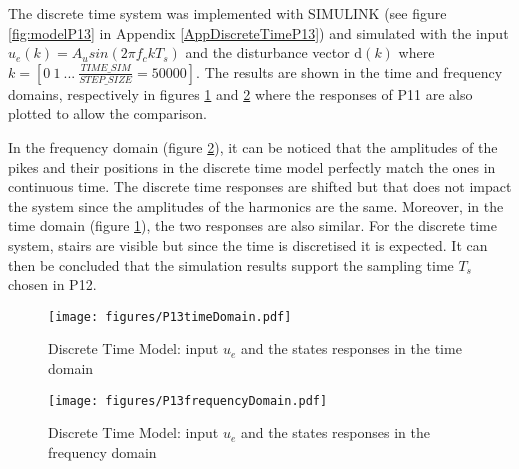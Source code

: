 The discrete time system was implemented with SIMULINK (see figure \ref{fig:modelP13} in Appendix \ref{AppDiscreteTimeP13}) and simulated with the input $u_e(k) = A_u sin(2\pi f_c k T_s)$ and the disturbance vector $\text{d}(k)$ where $k = [0 \ 1 \ ... \ \frac{TIME\_SIM}{STEP\_SIZE} = 50000]$. The results are shown in the time and frequency domains, respectively in figures \ref{fig:P13t} and \ref{fig:P13f} where the responses of P11 are also plotted to allow the comparison. 

In the frequency domain (figure \ref{fig:P13f}), it can be noticed that the amplitudes of the pikes and their positions in the discrete time model perfectly match the ones in continuous time. The discrete time responses are shifted but that does not impact the system since the amplitudes of the harmonics are the same. Moreover, in the time domain (figure \ref{fig:P13t}), the two responses are also similar. For the discrete time system, stairs are visible but since the time is discretised it is expected. It can then be concluded that the simulation results support the sampling time $T_s$ chosen in P12.

\begin{figure}[H]
 \centering 
 \texttt{[image: figures/P13timeDomain.pdf]}
 \caption{Discrete Time Model: input $u_e$ and the states responses in the time domain}
 \label{fig:P13t}
\end{figure}

\begin{figure}[H]
 \centering 
 \texttt{[image: figures/P13frequencyDomain.pdf]}
 \caption{Discrete Time Model: input $u_e$ and the states responses in the frequency domain}
 \label{fig:P13f}
\end{figure}